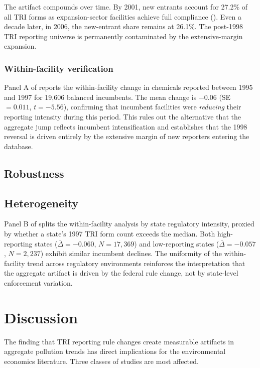 \documentclass[12pt]{article}
\begin{document}
The artifact compounds over time. By 2001, new entrants account for 27.2\% of all TRI forms as expansion-sector facilities achieve full compliance (). Even a decade later, in 2006, the new-entrant share remains at 26.1\%. The post-1998 TRI reporting universe is permanently contaminated by the extensive-margin expansion.

\subsubsection*{Within-facility verification} Panel A of  reports the within-facility change in chemicals reported between 1995 and 1997 for 19,606 balanced incumbents. The mean change is $-0.06$ (SE $= 0.011$, $t = -5.56$), confirming that incumbent facilities were \textit{reducing} their reporting intensity during this period. This rules out the alternative that the aggregate jump reflects incumbent intensification and establishes that the 1998 reversal is driven entirely by the extensive margin of new reporters entering the database.

\subsection{Robustness}



\subsection{Heterogeneity}

Panel B of  splits the within-facility analysis by state regulatory intensity, proxied by whether a state's 1997 TRI form count exceeds the median. Both high-reporting states ($\bar{\Delta} = -0.060$, $N = 17{,}369$) and low-reporting states ($\bar{\Delta} = -0.057$, $N = 2{,}237$) exhibit similar incumbent declines. The uniformity of the within-facility trend across regulatory environments reinforces the interpretation that the aggregate artifact is driven by the federal rule change, not by state-level enforcement variation.

\section{Discussion}

The finding that TRI reporting rule changes create measurable artifacts in aggregate pollution trends has direct implications for the environmental economics literature. Three classes of studies are most affected.
\end{document}
